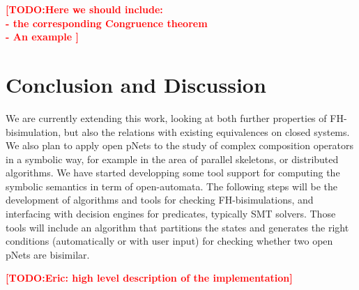 \documentclass{lncs/llncs}
\newcommand{\TODO}[1]{\textcolor{red}{\textbf{[TODO:#1]}}}
\begin{document}


\TODO{Here we should include:
  \\  - the corresponding Congruence theorem
  \\- An example
}



\section{Conclusion and Discussion}
\label{section:conclusion}


We are currently extending this work,  looking at  both further properties of 
FH-bisimulation, but also
the relations with existing equivalences on closed systems.
We also plan to apply open pNets to the study of complex composition
operators in a symbolic way, for example in the area of parallel
skeletons, or distributed algorithms.
We have started developping some tool support for computing the
symbolic semantics in term of open-automata. The following steps will
be the development of algorithms and tools for checking 
FH-bisimulations, and interfacing with decision engines for
predicates, typically SMT solvers. Those tools will include
an algorithm that partitions the states and generates the right
conditions (automatically or with user input) for checking
whether two open pNets are bisimilar.

\TODO{Eric: high level description of the implementation}
\end{document}
